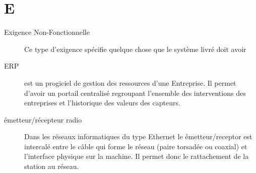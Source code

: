 \section{E}

\begin{description}

\item[Exigence Non-Fonctionnelle] Ce type d'exigence spécifie quelque chose que 
le système livré doit avoir

\item[ERP] est un progiciel de gestion des ressources d'une Entreprise. 
Il permet d'avoir un portail centralisé regroupant l'ensemble des interventions 
des entreprises et l'historique des valeurs des capteurs.

\item[émetteur/récepteur radio]Dans les réseaux informatiques du type Ethernet le émetteur/receptor est intercalé entre le câble qui forme le réseau (paire torsadée ou coaxial) et l'interface physique sur la machine. Il permet donc le rattachement de la station au réseau.



\end{description}
